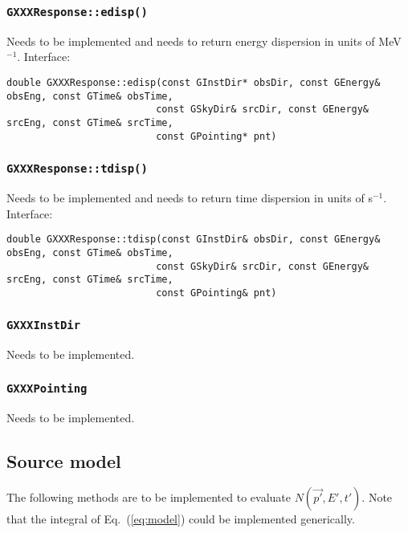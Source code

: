 \documentclass{article}[12pt,a4]
\begin{document}
\subsubsection{{\tt GXXXResponse::edisp()}}

Needs to be implemented and needs to return energy dispersion in units of MeV$^{-1}$.
Interface:
\begin{verbatim}
double GXXXResponse::edisp(const GInstDir* obsDir, const GEnergy& obsEng, const GTime& obsTime,
                          const GSkyDir& srcDir, const GEnergy& srcEng, const GTime& srcTime,
                          const GPointing* pnt)
\end{verbatim}


\subsubsection{{\tt GXXXResponse::tdisp()}}

Needs to be implemented and needs to return time dispersion in units of s$^{-1}$.
Interface:
\begin{verbatim}
double GXXXResponse::tdisp(const GInstDir& obsDir, const GEnergy& obsEng, const GTime& obsTime,
                          const GSkyDir& srcDir, const GEnergy& srcEng, const GTime& srcTime,
                          const GPointing& pnt)
\end{verbatim}


\subsubsection{{\tt GXXXInstDir}}

Needs to be implemented.


\subsubsection{{\tt GXXXPointing}}

Needs to be implemented.


\subsection{Source model}

The following methods are to be implemented to evaluate $N(\vec{p'}, E', t')$.
Note that the integral of Eq.~(\ref{eq:model}) could be implemented
generically.
\end{document}
